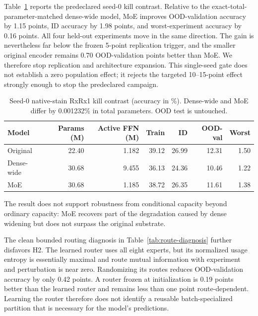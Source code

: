 Table~\ref{tab:kill-contrast} reports the predeclared seed-0 kill contrast. Relative to the
exact-total-parameter-matched dense-wide model, MoE improves OOD-validation accuracy by 1.15 points,
ID accuracy by 1.98 points, and worst-experiment accuracy by 0.16 points. All four held-out
experiments move in the same direction. The gain is nevertheless far below the frozen 5-point
replication trigger, and the smaller original encoder remains 0.70 OOD-validation points better
than MoE. We therefore stop replication and architecture expansion. This single-seed gate does not
establish a zero population effect; it rejects the targeted 10--15-point effect strongly enough to
stop the predeclared campaign.

\begin{table}[t]
  \centering
  \caption{Seed-0 native-stain RxRx1 kill contrast (accuracy in \%). Dense-wide and MoE differ by
  0.001232\% in total parameters. OOD test is untouched.}
  \label{tab:kill-contrast}
  \begin{tabular}{lrrrrrr}
    \toprule
    Model & Params (M) & Active FFN (M) & Train & ID & OOD-val & Worst \\
    \midrule
    Original & 22.40 & 1.182 & 39.12 & 26.99 & 12.31 & 1.50 \\
    Dense-wide & 30.68 & 9.455 & 36.13 & 24.36 & 10.46 & 1.22 \\
    MoE & 30.68 & 1.185 & 38.72 & 26.35 & 11.61 & 1.38 \\
    \bottomrule
  \end{tabular}
\end{table}

The result does not support robustness from conditional capacity beyond ordinary capacity: MoE
recovers part of the degradation caused by dense widening but does not surpass the original
substrate.

The clean bounded routing diagnosis in Table~\ref{tab:route-diagnosis} further disfavors H2. The
learned router uses all eight experts, but its normalized usage entropy is essentially maximal and
route mutual information with experiment and perturbation is near zero. Randomizing its routes
reduces OOD-validation accuracy by only 0.42 points. A router frozen at initialization is 0.19
points better than the learned router and remains less than one point route-dependent. Learning the
router therefore does not identify a reusable batch-specialized partition that is necessary for
the model's predictions.

